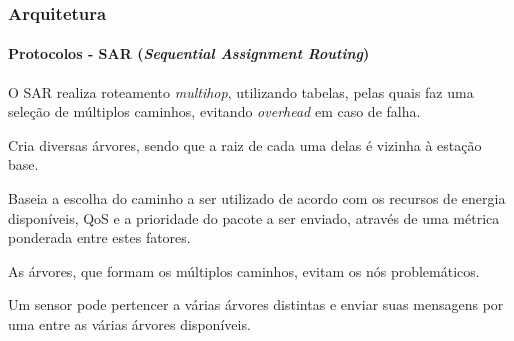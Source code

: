\documentclass[notes]{beamer}
\begin{document}
\begin{frame}
\frametitle{Arquitetura}
\framesubtitle{Protocolos - SAR (\textit{Sequential Assignment Routing})}

\begin{block}

O SAR realiza roteamento \textit{multihop}, utilizando tabelas, pelas quais faz uma seleção de múltiplos caminhos, evitando \textit{overhead} em caso de falha.

\end{block} \pause

\begin{block}

Cria diversas árvores, sendo que a raiz de cada uma delas é vizinha à estação base. 

\end{block} \pause

\begin{block}

Baseia a escolha do caminho a ser utilizado de acordo com os recursos de energia disponíveis, QoS e a prioridade do pacote a ser enviado, através de uma métrica ponderada entre estes fatores.

\end{block} \pause

\begin{block}

As árvores, que formam os múltiplos caminhos, evitam os nós problemáticos.

\end{block} \pause

\begin{block}

Um sensor pode pertencer a várias árvores distintas e enviar suas mensagens por uma entre as várias árvores disponíveis.

\end{block}

\end{frame}
\end{document}
